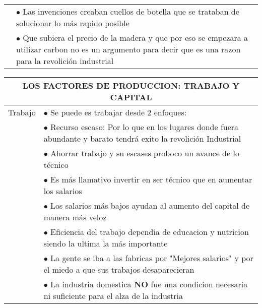 \begin{tabular}{p{3cm}|p{12cm}}
                               & $\bullet$ Las invenciones creaban cuellos de botella que se trataban de solucionar lo más rapido posible                                                                  \\
                               & $\bullet$ Que subiera el precio de la madera y que por eso se empezara a utilizar carbon no es un argumento para decir que es una razon para la revolición industrial
\end{tabular}
\endgroup

\begingroup
\setlength{\tabcolsep}{12pt} %
\renewcommand{\arraystretch}{1.5} %
\begin{tabular}{p{3cm}|p{11cm}}
  \multicolumn{2}{c}{\large LOS FACTORES DE PRODUCCION: TRABAJO Y CAPITAL}                                                                                          \\ \hline
  Trabajo & $\bullet$ Se puede es trabajar desde 2 enfoques:                                                                                                        \\
          & \hspace{1cm} $\bullet$ Recurso escaso: Por lo que en los lugares donde fuera abundante y barato tendrá exito la revolición Industrial                   \\
          & \hspace{1cm} $\bullet$ Ahorrar trabajo y su escases proboco un avance de lo técnico                                                                     \\
          & $\bullet$ Es más llamativo invertir en ser técnico que en aumentar los salarios                                                                         \\
          & $\bullet$ Los salarios más bajos ayudan al aumento del capital de manera más veloz                                                                      \\
          & $\bullet$ Eficiencia del trabajo dependia de educacion y nutricion siendo la ultima la más importante                                                   \\
          & $\bullet$ La gente se iba a las fabricas por "Mejores salarios" y por el miedo a que sus trabajos desaparecieran                                        \\
          & $\bullet$ La industria domestica {\bf NO} fue una condicion necesaria ni suficiente para el alza de la industria                                        \\

\end{tabular}
